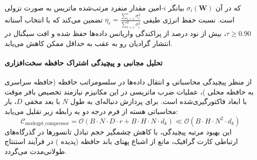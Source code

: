 که در آن $\sigma_i(\mathbf{W})$ بیانگر $i$-امین مقدار منفرد مرتب‌شده ماتریس به صورت نزولی است. نسبت حفظ انرژی طیفی $\eta_r = \frac{\sum_{i=1}^r \sigma_i^2}{\sum_{i=1}^{d} \sigma_i^2}$ تضمین می‌کند که با انتخاب آستانه $\tau \ge 0.90$، بیش از نود درصد از پراکندگی واریانس داده‌ها حفظ شده و افت سیگنال در انتشار گرادیان رو به عقب به حداقل ممکن کاهش می‌یابد.

\paragraph{تحلیل مجانبی و پیچیدگی اشتراک حافظه سخت‌افزاری}
از منظر پیچیدگی محاسباتی و انتقال داده‌ها در سلسومراتب حافظه (حافظه سراسری  به حافظه محلی )، عملیات ضرب ماتریسی در این مکانیزم نیازمند تخصیص بافر موقت با ابعاد فاکتورگیری‌شده است. برای پردازش دنباله‌ای به طول $N$ با بعد مخفی $D$، بار محاسباتی هسته از فرم درجه دو به رابطه زیر تقلیل می‌یابد:
\begin{equation}
\label{eq:complexity_modegpt_compressor}
\mathcal{C}_{\text{modegpt\_compressor}} = \mathcal{O}\left( B \cdot N \cdot D \cdot r + B \cdot H \cdot N \cdot d_k \right) \ll \mathcal{O}\left( B \cdot H \cdot N^2 \cdot d_k \right)
\end{equation}
این بهبود مرتبه پیچیدگی، با کاهش چشمگیر حجم تبادل تانسورها در گذرگاه‌های ارتباطی کارت گرافیک، مانع از اشباع پهنای باند حافظه (پدیده ) در فرآیند استنتاج طولانی‌مدت می‌گردد.
